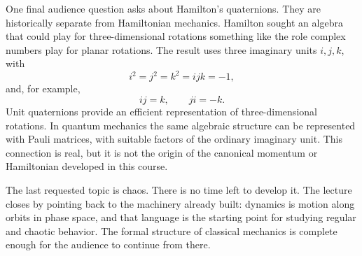One final audience question asks about Hamilton's quaternions. They are historically separate from Hamiltonian mechanics. Hamilton sought an algebra that could play for three-dimensional rotations something like the role complex numbers play for planar rotations. The result uses three imaginary units \(i,j,k\), with
\begin{equation}
  i^2=j^2=k^2=ijk=-1,
\end{equation}
and, for example,
\begin{equation}
  ij=k,
  \qquad
  ji=-k.
\end{equation}
Unit quaternions provide an efficient representation of three-dimensional rotations. In quantum mechanics the same algebraic structure can be represented with Pauli matrices, with suitable factors of the ordinary imaginary unit. This connection is real, but it is not the origin of the canonical momentum or Hamiltonian developed in this course.

The last requested topic is chaos. There is no time left to develop it. The lecture closes by pointing back to the machinery already built: dynamics is motion along orbits in phase space, and that language is the starting point for studying regular and chaotic behavior. The formal structure of classical mechanics is complete enough for the audience to continue from there.
